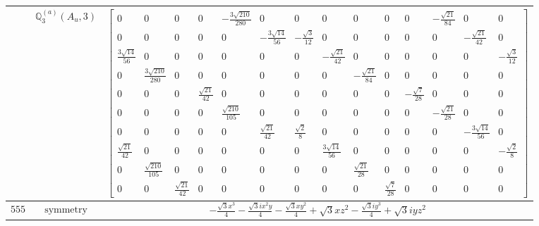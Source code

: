 \documentclass[fleqn,8pt,landscape]{jsarticle}
\begin{document}
\begin{longtable}{ccc}
$  $ & $ \mathbb{Q}_{3}^{(a)}(A_{u},3) $ & $ \begin{bmatrix} 0 & 0 & 0 & 0 & - \frac{3 \sqrt{210}}{280} & 0 & 0 & 0 & 0 & 0 & 0 & - \frac{\sqrt{21}}{84} & 0 & 0 \\ 0 & 0 & 0 & 0 & 0 & - \frac{3 \sqrt{14}}{56} & - \frac{\sqrt{3}}{12} & 0 & 0 & 0 & 0 & 0 & - \frac{\sqrt{21}}{42} & 0 \\ \frac{3 \sqrt{14}}{56} & 0 & 0 & 0 & 0 & 0 & 0 & - \frac{\sqrt{21}}{42} & 0 & 0 & 0 & 0 & 0 & - \frac{\sqrt{3}}{12} \\ 0 & \frac{3 \sqrt{210}}{280} & 0 & 0 & 0 & 0 & 0 & 0 & - \frac{\sqrt{21}}{84} & 0 & 0 & 0 & 0 & 0 \\ 0 & 0 & 0 & \frac{\sqrt{21}}{42} & 0 & 0 & 0 & 0 & 0 & 0 & - \frac{\sqrt{7}}{28} & 0 & 0 & 0 \\ 0 & 0 & 0 & 0 & \frac{\sqrt{210}}{105} & 0 & 0 & 0 & 0 & 0 & 0 & - \frac{\sqrt{21}}{28} & 0 & 0 \\ 0 & 0 & 0 & 0 & 0 & \frac{\sqrt{21}}{42} & \frac{\sqrt{2}}{8} & 0 & 0 & 0 & 0 & 0 & - \frac{3 \sqrt{14}}{56} & 0 \\ \frac{\sqrt{21}}{42} & 0 & 0 & 0 & 0 & 0 & 0 & \frac{3 \sqrt{14}}{56} & 0 & 0 & 0 & 0 & 0 & - \frac{\sqrt{2}}{8} \\ 0 & \frac{\sqrt{210}}{105} & 0 & 0 & 0 & 0 & 0 & 0 & \frac{\sqrt{21}}{28} & 0 & 0 & 0 & 0 & 0 \\ 0 & 0 & \frac{\sqrt{21}}{42} & 0 & 0 & 0 & 0 & 0 & 0 & \frac{\sqrt{7}}{28} & 0 & 0 & 0 & 0 \end{bmatrix} $ \\ \hline
$ 555 $ & $ \text{symmetry} $ & $ - \frac{\sqrt{3} x^{3}}{4} - \frac{\sqrt{3} i x^{2} y}{4} - \frac{\sqrt{3} x y^{2}}{4} + \sqrt{3} x z^{2} - \frac{\sqrt{3} i y^{3}}{4} + \sqrt{3} i y z^{2} $ \\

\end{longtable}
\end{document}
